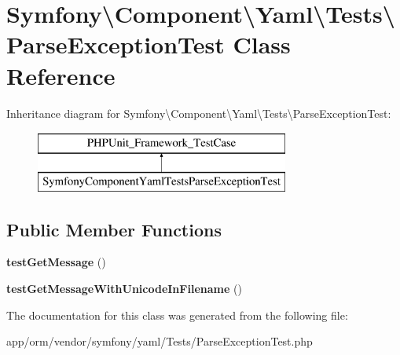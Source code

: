 \hypertarget{classSymfony_1_1Component_1_1Yaml_1_1Tests_1_1ParseExceptionTest}{}\section{Symfony\textbackslash{}Component\textbackslash{}Yaml\textbackslash{}Tests\textbackslash{}Parse\+Exception\+Test Class Reference}
\label{classSymfony_1_1Component_1_1Yaml_1_1Tests_1_1ParseExceptionTest}
Inheritance diagram for Symfony\textbackslash{}Component\textbackslash{}Yaml\textbackslash{}Tests\textbackslash{}Parse\+Exception\+Test\+:\begin{figure}[H]
\begin{center}
\leavevmode
\includegraphics[height=2.000000cm]{classSymfony_1_1Component_1_1Yaml_1_1Tests_1_1ParseExceptionTest}
\end{center}
\end{figure}
\subsection*{Public Member Functions}
\begin{DoxyCompactItemize}
\item 
{\bfseries test\+Get\+Message} ()\hypertarget{classSymfony_1_1Component_1_1Yaml_1_1Tests_1_1ParseExceptionTest_aaed931cb89b9c3e9b0c60e0e547e7d0e}{}\label{classSymfony_1_1Component_1_1Yaml_1_1Tests_1_1ParseExceptionTest_aaed931cb89b9c3e9b0c60e0e547e7d0e}

\item 
{\bfseries test\+Get\+Message\+With\+Unicode\+In\+Filename} ()\hypertarget{classSymfony_1_1Component_1_1Yaml_1_1Tests_1_1ParseExceptionTest_abeae6129a4cbdbdf9b7fe02f470c7251}{}\label{classSymfony_1_1Component_1_1Yaml_1_1Tests_1_1ParseExceptionTest_abeae6129a4cbdbdf9b7fe02f470c7251}

\end{DoxyCompactItemize}


The documentation for this class was generated from the following file\+:\begin{DoxyCompactItemize}
\item 
app/orm/vendor/symfony/yaml/\+Tests/Parse\+Exception\+Test.\+php\end{DoxyCompactItemize}
